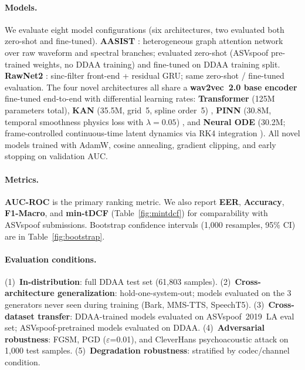 \documentclass{article}
\newcommand{\ddaa}{\textsc{DDAA}}
\begin{document}
\paragraph{Models.}
We evaluate eight model configurations (six architectures, two evaluated
both zero-shot and fine-tuned).
\textbf{AASIST} \citep{jung2022aasist}: heterogeneous
graph attention network over raw waveform and spectral branches; evaluated
zero-shot (ASVspoof pre-trained weights, no \ddaa{} training) and
fine-tuned on \ddaa{} training split.  \textbf{RawNet2} \citep{tak2021end}:
sinc-filter front-end + residual GRU; same zero-shot / fine-tuned evaluation.
The four novel architectures all share a \textbf{wav2vec~2.0 base encoder}
\citep{baevski2020wav2vec} fine-tuned end-to-end with differential learning rates:
\textbf{Transformer} (125M parameters total), \textbf{KAN} (35.5M, grid~5,
spline order~5) \citep{liu2024kan}, \textbf{PINN} (30.8M, temporal
smoothness physics loss with $\lambda{=}0.05$) \citep{raissi2019physics},
and \textbf{Neural ODE}
(30.2M; frame-controlled continuous-time latent dynamics via RK4 integration
\citep{chen2018neural}).
All novel models trained with AdamW, cosine annealing, gradient clipping,
and early stopping on validation AUC.

\paragraph{Metrics.}
\textbf{AUC-ROC} is the primary ranking metric.  We also report
\textbf{EER}, \textbf{Accuracy}, \textbf{F1-Macro}, and
\textbf{min-tDCF} (Table~\ref{fig:mintdcf}) for comparability with ASVspoof
submissions.  Bootstrap confidence intervals (1,000 resamples, 95\% CI) are
in Table~\ref{fig:bootstrap}.

\paragraph{Evaluation conditions.}
(1)~\textbf{In-distribution}: full \ddaa{} test set (61,803 samples).
(2)~\textbf{Cross-architecture generalization}: hold-one-system-out; models
evaluated on the 3 generators never seen during training (Bark, MMS-TTS,
SpeechT5).
(3)~\textbf{Cross-dataset transfer}: \ddaa-trained models evaluated on
ASVspoof~2019~LA eval set; ASVspoof-pretrained models evaluated on \ddaa{}.
(4)~\textbf{Adversarial robustness}: FGSM, PGD ($\varepsilon$=0.01), and
CleverHans \citep{papernot2018cleverhans} psychoacoustic attack on 1,000 test samples.
(5)~\textbf{Degradation robustness}: stratified by codec/channel condition.
\end{document}
